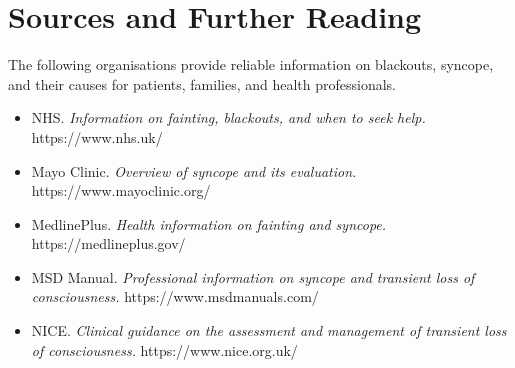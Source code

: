 \section*{Sources and Further Reading}
The following organisations provide reliable information on blackouts, syncope, and their causes for patients, families, and health professionals.

\begin{itemize}
    \item NHS. \textit{Information on fainting, blackouts, and when to seek help.} https://www.nhs.uk/
    \item Mayo Clinic. \textit{Overview of syncope and its evaluation.} https://www.mayoclinic.org/
    \item MedlinePlus. \textit{Health information on fainting and syncope.} https://medlineplus.gov/
    \item MSD Manual. \textit{Professional information on syncope and transient loss of consciousness.} https://www.msdmanuals.com/
    \item NICE. \textit{Clinical guidance on the assessment and management of transient loss of consciousness.} https://www.nice.org.uk/
\end{itemize}
